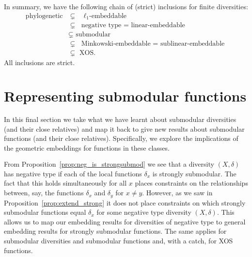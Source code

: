 \documentclass{article}
\theoremstyle{plain}
\theoremstyle{definition}
\begin{document}
In summary, we have the following chain of (strict) inclusions for finite diversities:
\begin{align*}
\mbox{phylogenetic} & \subsetneq \mbox{ $\ell_1$-embeddable} \\
& \subsetneq \mbox{ negative type $=$ linear-embeddable}\\
& \subsetneq \mbox{ submodular }\\
& \subsetneq \mbox{ Minkowski-embeddable $=$ sublinear-embeddable} \\
& \subsetneq \mbox{ XOS}.
\end{align*}
All inclusions are strict.

\section{Representing submodular functions}

In this final section we take what we have learnt about submodular diversities (and their close relatives) and map it back to give new results about submodular functions (and their close relatives). Specifically, we explore the implications of the geometric embeddings for functions in these classes. 

From Proposition~\ref{prop:neg_is_strongsubmod} we see that a diversity $(X,\delta)$ has negative type if each of the local functions $\delta_x$ is strongly submodular. The fact that this holds simultaneously for all $x$ places constraints on the relationships between, say, the functions $\delta_x$ and $\delta_y$ for $x \neq y$. However, as we saw in Proposition~\ref{prop:extend_strong} it does not place constraints on which strongly submodular functions equal $\delta_x$ for some negative type diversity $(X,\delta)$. This allows us to map our embedding results for diversities of negative type to general embedding results for strongly submodular functions. The same applies for submodular diversities and submodular functions and, with a catch, for XOS functions. 
\end{document}
